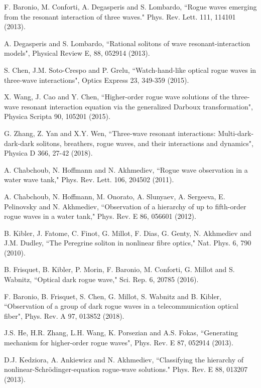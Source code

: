 \documentclass[amsmath,amssymb]{revtex4}
\begin{document}
\begin{thebibliography}{10}
F. Baronio, M. Conforti, A. Degasperis and S. Lombardo,
``Rogue waves emerging from the resonant interaction of three waves."
Phys. Rev. Lett. 111, 114101 (2013).

A. Degasperis and S. Lombardo,
``Rational solitons of wave resonant-interaction models",
Physical Review E, 88, 052914 (2013).

S. Chen, J.M. Soto-Crespo and P. Grelu,
``Watch-hand-like optical rogue waves in three-wave interactions",
Optics Express 23, 349-359 (2015).

X. Wang, J. Cao and Y. Chen,
``Higher-order rogue wave solutions of the three-wave resonant interaction equation via the generalized Darboux transformation",
Physica Scripta 90, 105201 (2015).

G. Zhang, Z. Yan and X.Y. Wen,
``Three-wave resonant interactions: Multi-dark-dark-dark solitons, breathers, rogue waves, and their interactions and dynamics",
Physica D 366, 27-42 (2018).

A. Chabchoub, N. Hoffmann and N. Akhmediev,
``Rogue wave observation in a water wave tank,"
Phys. Rev. Lett. 106, 204502 (2011).

A. Chabchoub, N. Hoffmann, M. Onorato, A. Slunyaev, A. Sergeeva, E. Pelinovsky and N. Akhmediev,
``Observation of a hierarchy of up to fifth-order rogue waves in a water tank,"
Phys. Rev. E 86, 056601 (2012).

B. Kibler, J. Fatome, C. Finot, G. Millot, F. Dias, G. Genty, N. Akhmediev and J.M. Dudley,
``The Peregrine soliton in nonlinear fibre optics,"
Nat. Phys. 6, 790 (2010).

B. Frisquet, B. Kibler, P. Morin, F. Baronio, M. Conforti, G. Millot and S. Wabnitz,
``Optical dark rogue wave,"
Sci. Rep. 6, 20785 (2016).

F. Baronio, B. Frisquet, S. Chen, G. Millot, S. Wabnitz and B. Kibler,
``Observation of a group of dark rogue waves in a telecommunication optical fiber",
Phys. Rev. A 97, 013852 (2018).

J.S. He, H.R. Zhang, L.H. Wang, K. Porsezian and A.S. Fokas,
``Generating mechanism for higher-order rogue waves",
Phys. Rev. E 87, 052914 (2013).

D.J. Kedziora, A. Ankiewicz and N. Akhmediev,
``Classifying the hierarchy of nonlinear-Schr\"{o}dinger-equation rogue-wave solutions."
Phys. Rev. E 88, 013207 (2013).


\end{thebibliography}
\end{document}
